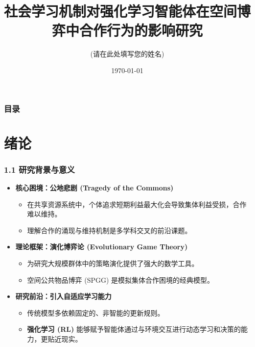 \documentclass[UTF8]{beamer}
\title{社会学习机制对强化学习智能体在空间博弈中合作行为的影响研究}
\author{(请在此处填写您的姓名)}
\institute{（请在此处填写您所在的院系）}
\date{\today}
\begin{document}
\begin{frame}
    \titlepage
\end{frame}

\begin{frame}
    \frametitle{目录}
    \tableofcontents
\end{frame}


\section{绪论}
\begin{frame}
    \frametitle{1.1 研究背景与意义}
    \begin{itemize}
        \item<1-> \textbf{核心困境：公地悲剧 (Tragedy of the Commons)}
        \begin{itemize}
            \item 在共享资源系统中，个体追求短期利益最大化会导致集体利益受损，合作难以维持。
            \item 理解合作的涌现与维持机制是多学科交叉的前沿课题。
        \end{itemize}
        \pause
        \item<2-> \textbf{理论框架：演化博弈论 (Evolutionary Game Theory)}
        \begin{itemize}
            \item 为研究大规模群体中的策略演化提供了强大的数学工具。
            \item 空间公共物品博弈 (SPGG) 是模拟集体合作困境的经典模型。
        \end{itemize}
        \pause
        \item<3-> \textbf{研究前沿：引入自适应学习能力}
        \begin{itemize}
            \item 传统模型多依赖固定的、非智能的更新规则。
            \item \textbf{强化学习 (RL)} 能够赋予智能体通过与环境交互进行动态学习和决策的能力，更贴近现实。
        \end{itemize}
    \end{itemize}
\end{frame}
\end{document}
